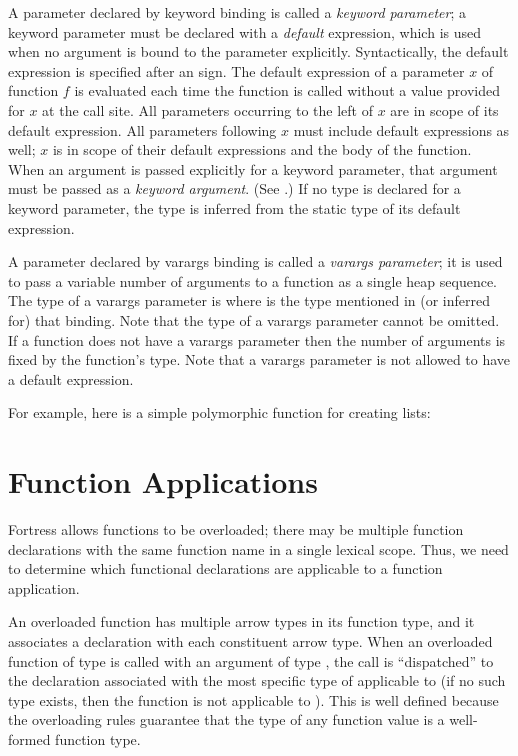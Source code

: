 A parameter declared by keyword binding is called
a \emph{keyword parameter};
a keyword parameter must be declared with
a \emph{default} expression,
which is used when no argument is bound to the parameter explicitly.
Syntactically, the default expression is specified
after an \EXP{=} sign.
The default expression of a parameter $x$ of function $f$
is evaluated each time the function is called
without a value provided for $x$ at the call site.
All parameters occurring to the left of $x$
are in scope of its default expression.
All parameters following $x$ must include default expressions as well;
$x$ is in scope of their default expressions and the body of the function.
When an argument is passed explicitly for a keyword parameter,
that argument must be passed as a \emph{keyword argument}.
(See .)
If no type is declared for a keyword parameter,
the type is inferred from the static type of its default expression.

A parameter declared by varargs binding is called
a \emph{varargs parameter};
it is used to pass a variable number of arguments to a function
as a single heap sequence.
The type of a varargs parameter
    is  where  is
    the type mentioned in (or inferred for) that binding.
Note that the type of a varargs parameter cannot be omitted.
If a function does not have a varargs parameter
then the number of arguments is fixed by the function's type.
Note that a varargs parameter is not allowed to have a default expression.

For example, here is a simple
polymorphic function for creating lists:


\section{Function Applications}

Fortress allows functions to be overloaded; there may be multiple function
declarations with the same function name in a single lexical scope.
Thus, we need to determine which functional declarations are applicable to
a function application.

An overloaded function has multiple arrow types in its function type,
and it associates a declaration with each constituent arrow type.
When an overloaded function of type  is called with an argument of type
, the call is ``dispatched'' to the declaration associated with
the most specific type of  applicable to 
(if no such type exists, then the function is not applicable to ).
This is well defined because the overloading rules guarantee that
the type of any function value is a well-formed function type.

